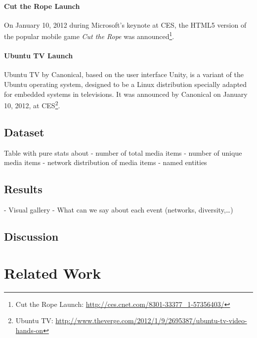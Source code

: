 \documentclass{acm_proc_article-sp}
\newcommand{\inlinelistingsize}{\fontsize{8pt}{11pt}}
\let\oldurl\url
\renewcommand{\url}[1]{\inlinelistingsize\oldurl{#1}}
\begin{document}
\paragraph{Cut the Rope Launch}
On January 10, 2012 during Microsoft's keynote at CES, the HTML5 version of the popular mobile game \textit{Cut the Rope} was announced\footnote{Cut the Rope Launch: \url{http://ces.cnet.com/8301-33377_1-57356403/}}.

\paragraph{Ubuntu TV Launch}
Ubuntu TV by Canonical, based on the user interface Unity, is a variant of the Ubuntu operating system, designed to be a Linux distribution specially adapted for embedded systems in televisions. It was announced by Canonical on January 10, 2012, at CES\footnote{Ubuntu TV: \url{http://www.theverge.com/2012/1/9/2695387/ubuntu-tv-video-hands-on}}.

\subsection{Dataset}
Table with pure stats about
- number of total media items
- number of unique media items
- network distribution of media items 
- named entities

\subsection{Results}
- Visual gallery
- What can we say about each event (networks, diversity,…)

\subsection{Discussion}

\section{Related Work} \label{sec:relatedwork}
\end{document}
